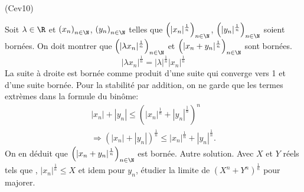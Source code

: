 \begin{tiny}(Cev10)\end{tiny} Soit $\lambda \in \R$ et $\left( x_n \right)_{n \in \N}$, $\left( y_n \right)_{n \in \N}$ telles que $\left( |x_n|^{\frac{1}{n}} \right)_{n \in \N}$, $\left( |y_n|^{\frac{1}{n}} \right)_{n \in \N}$ soient bornées. On doit montrer que $\left( |\lambda x_n|^{\frac{1}{n}} \right)_{n \in \N}$ et $\left( |x_n + y_n|^{\frac{1}{n}} \right)_{n \in \N}$ sont bornées.
\[
 |\lambda x_n|^{\frac{1}{n}} = |\lambda|^{\frac{1}{n}} |x_n|^{\frac{1}{n}}
\]
La suite à droite est bornée comme produit d'une suite qui converge vers 1 et d'une suite bornée. Pour la stabilité par addition, on ne garde que les termes extrèmes dans la formule du binôme:
\begin{multline*}
|x_n| + |y_n| \leq \left(|x_n|^{\frac{1}{n}} + |y_n|^{\frac{1}{n}}\right)^{n} \\
\Rightarrow
\left( |x_n| + |y_n|\right)^{\frac{1}{n}} \leq |x_n|^{\frac{1}{n}} + |y_n|^{\frac{1}{n}}. 
\end{multline*}
On en déduit que $\left( |x_n + y_n|^{\frac{1}{n}} \right)_{n \in \N}$ est bornée.\newline
Autre solution. Avec $X$ et $Y$ réels tels que , $|x_n|^{\frac{1}{n}} \leq X$ et idem pour $y_n$, étudier la limite de $(X^n + Y^n)^{\frac{1}{n}}$ pour majorer.
